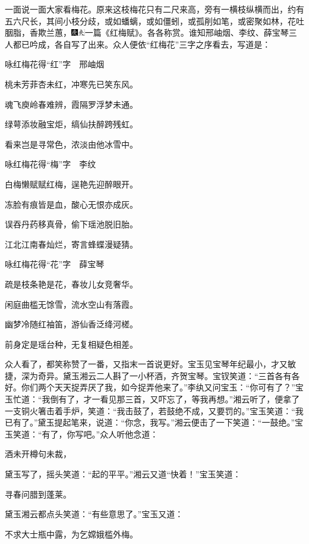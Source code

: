 一面说一面大家看梅花。原来这枝梅花只有二尺来高，旁有一横枝纵横而出，约有五六尺长，其间小枝分歧，或如蟠螭，或如僵蚓，或孤削如笔，或密聚如林，花吐胭脂，香欺兰蕙，{\includegraphics[width=3mm]{../Images/00004}\includegraphics[width=3mm]{../Images/00012}\footnotesize \kaishu 一篇《红梅赋》。}各各称赏。谁知邢岫烟、李纹、薛宝琴三人都已吟成，各自写了出来。众人便依“红梅花”三字之序看去，写道是：

咏红梅花{得“红”字　邢岫烟}

桃未芳菲杏未红，冲寒先已笑东风。

魂飞庾岭春难辨，霞隔罗浮梦未通。

绿萼添妆融宝炬，缟仙扶醉跨残虹。

看来岂是寻常色，浓淡由他冰雪中。

咏红梅花{得“梅”字　李纹}

白梅懒赋赋红梅，逞艳先迎醉眼开。

冻脸有痕皆是血，酸心无恨亦成灰。

误吞丹药移真骨，偷下瑶池脱旧胎。

江北江南春灿烂，寄言蜂蝶漫疑猜。

咏红梅花{得“花”字　薛宝琴}

疏是枝条艳是花，春妆儿女竞奢华。

闲庭曲槛无馀雪，流水空山有落霞。

幽梦冷随红袖笛，游仙香泛绛河槎。

前身定是瑶台种，无复相疑色相差。

众人看了，都笑称赞了一番，又指末一首说更好。宝玉见宝琴年纪最小，才又敏捷，深为奇异。黛玉湘云二人斟了一小杯酒，齐贺宝琴。宝钗笑道：“三首各有各好。你们两个天天捉弄厌了我，如今捉弄他来了。”李纨又问宝玉：“你可有了？”宝玉忙道：“我倒有了，才一看见那三首，又吓忘了，等我再想。”湘云听了，便拿了一支铜火箸击着手炉，笑道：“我击鼓了，若鼓绝不成，又要罚的。”宝玉笑道：“我已有了。”黛玉提起笔来，说道：“你念，我写。”湘云便击了一下笑道：“一鼓绝。”宝玉笑道：“有了，你写吧。”众人听他念道：

酒未开樽句未裁，

黛玉写了，摇头笑道：“起的平平。”湘云又道“快着！”宝玉笑道：

寻春问腊到蓬莱。

黛玉湘云都点头笑道：“有些意思了。”宝玉又道：

不求大士瓶中露，为乞嫦娥槛外梅。

